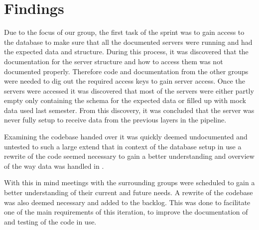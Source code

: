 \section{Findings}
Due to the focus of our group, the first task of the sprint was to gain access to the database to make 
sure that all the documented servers were running and had the expected data and structure. During this 
process, it was discovered that the documentation for the server structure and how to access them was
not documented properly. Therefore code and documentation from the other \knox{} groups were needed to dig out the 
required access keys to gain server access. Once the servers were accessed it was discovered that most 
of the servers were either partly empty only containing the schema for the expected data or filled up with 
mock data used last semester. From this discovery, it was concluded that the server was never fully setup 
to receive data from the previous layers in the pipeline. 


Examining the codebase handed over it was quickly deemed undocumented and untested to such a large extend 
that in context of the database setup in use a rewrite of the code seemed necessary to gain 
a better understanding and overview of the way data was handled in \knox. 


With this in mind meetings with the surrounding groups were scheduled to gain a better 
understanding of their current and future needs. A rewrite of the codebase was also deemed necessary and 
added to the backlog. This was done to facilitate one of the main requirements of this iteration, 
to improve the documentation of \knox and testing of the code in use.